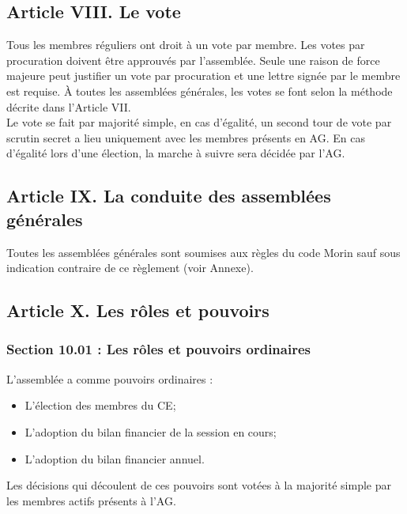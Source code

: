 \subsection*{Article VIII. Le vote}
Tous les membres réguliers ont droit à un vote par membre. Les votes par procuration doivent être approuvés par l’assemblée. Seule une raison de force majeure peut justifier un vote par procuration et une lettre signée par le membre est requise. À toutes les assemblées générales, les votes se font selon la méthode décrite dans l'Article VII.\\
Le vote se fait par majorité simple, en cas d'égalité, un second tour de vote par scrutin secret a lieu uniquement avec les membres présents en AG. En cas d’égalité lors d’une élection, la marche à suivre sera décidée par l’AG.

\subsection*{Article IX. La conduite des assemblées générales}
Toutes les assemblées générales sont soumises aux règles du code Morin sauf sous indication contraire de ce règlement (voir Annexe). 

\subsection*{Article X. Les rôles et pouvoirs}

\subsubsection*{Section 10.01 : Les rôles et pouvoirs ordinaires}
L’assemblée a comme pouvoirs ordinaires :
\begin{itemize}
\item L’élection des membres du CE;
\item L’adoption du bilan financier de la session en cours;
\item L’adoption du bilan financier annuel.
\end{itemize}
 
Les décisions qui découlent de ces pouvoirs sont votées à la majorité simple par les membres actifs présents à l’AG.

